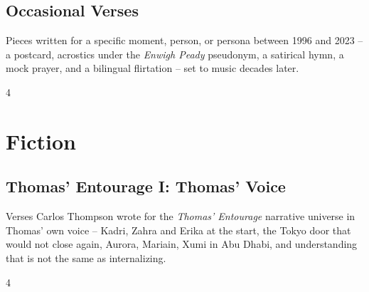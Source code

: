 \documentclass[a4paper,landscape]{memoir}
\begin{document}
\chapter{Occasional Verses}
Pieces written for a specific moment, person, or persona between 1996 and 2023 -- a postcard, acrostics under the \emph{Enwigh Peady} pseudonym, a satirical hymn, a mock prayer, and a bilingual flirtation -- set to music decades later.
\clearpage\begin{multicols*}{4}













\end{multicols*}

\part{Fiction}

\chapter{Thomas' Entourage I: Thomas' Voice}
Verses Carlos Thompson wrote for the \emph{Thomas’ Entourage} narrative universe in Thomas' own voice -- Kadri, Zahra and Erika at the start, the Tokyo door that would not close again, Aurora, Mariain, Xumi in Abu Dhabi, and understanding that is not the same as internalizing.
\clearpage\begin{multicols*}{4}













\end{multicols*}
\end{document}
